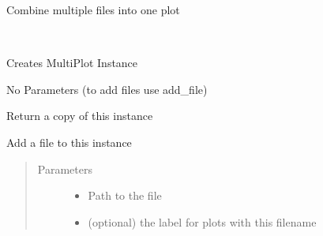 \documentclass[letterpaper,10pt,openany,oneside,english]{sphinxmanual}
\begin{document}

\begin{fulllineitems}
\label{\detokenize{plots:plots.MultiPlot}}
Combine multiple files into one plot

\begin{fulllineitems}
\label{\detokenize{plots:plots.MultiPlot.__init__}}~
\begin{DUlineblock}{0em}
\item[] Creates MultiPlot Instance  
\item[] No Parameters (to add files use add\_file)  
\end{DUlineblock}

\end{fulllineitems}


\begin{fulllineitems}
\label{\detokenize{plots:plots.MultiPlot.clone}}
Return a copy of this instance

\end{fulllineitems}


\begin{fulllineitems}
\label{\detokenize{plots:plots.MultiPlot.add_file}}
Add a file to this instance
\begin{quote}\begin{description}
\item[{Parameters}] \leavevmode\begin{itemize}
\item {} 
 \textendash{} Path to the file

\item {} 
 \textendash{} (optional) the label for plots with this filename

\end{itemize}

\end{description}\end{quote}


\end{fulllineitems}
\end{fulllineitems}
\end{document}
